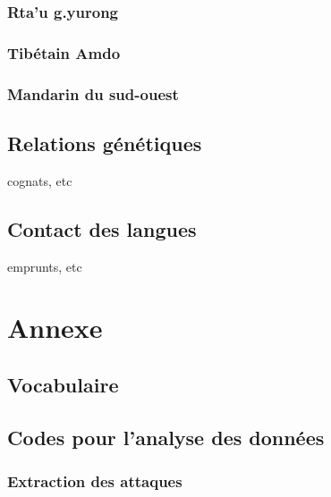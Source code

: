 \documentclass[11pt, a4paper]{book}              %
\begin{document}
\section{Rta'u g.yurong}
\section{Tibétain Amdo}
\section{Mandarin du sud-ouest}
\chapter{Relations génétiques}
cognats, etc
\chapter{Contact des langues}
emprunts, etc

\part{Annexe}
\chapter*{Vocabulaire}
\chapter*{Codes pour l'analyse des données}
\section*{Extraction des attaques}
\end{document}
